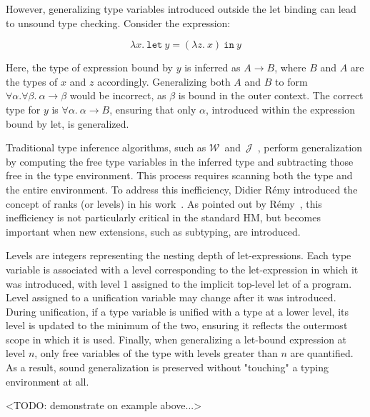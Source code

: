 However, generalizing type variables introduced outside the let binding can lead to unsound type checking. Consider the expression:

$$
\lambda x.\ \texttt{let}\ y = (\lambda z.\ x)\ \texttt{in}\ y
$$

Here, the type of expression bound by $y$ is inferred as $A \to B$, where $B$ and $A$ are the types of $x$ and $z$ accordingly. Generalizing both $A$ and $B$ to form $\forall \alpha. \forall \beta.\ \alpha \to \beta$ would be incorrect, as $\beta$ is bound in the outer context. The correct type for $y$ is $\forall \alpha.\ \alpha \to B$, ensuring that only $\alpha$, introduced within the expression bound by let, is generalized.

Traditional type inference algorithms, such as $\mathcal{W}$~and~$\mathcal{J}$~\cite{Milner1978_TypePolymorphism}, perform generalization by computing the free type variables in the inferred type and subtracting those free in the type environment. This process requires scanning both the type and the entire environment. To address this inefficiency, Didier R\'emy introduced the concept of ranks (or levels) in his work~\cite{Remy1992_SortedEqTheoryTypes}. As pointed out by R\'emy~\cite{Remy1992_SortedEqTheoryTypes}, this inefficiency is not particularly critical in the standard HM, but becomes important when new extensions, such as subtyping, are introduced.

Levels are integers representing the nesting depth of let-expressions. Each type variable is associated with a level corresponding to the let-expression in which it was introduced, with level 1 assigned to the implicit top-level let of a program. Level assigned to a unification variable may change after it was introduced. During unification, if a type variable is unified with a type at a lower level, its level is updated to the minimum of the two, ensuring it reflects the outermost scope in which it is used. Finally, when generalizing a let-bound expression at level $n$, only free variables of the type with levels greater than $n$ are quantified. As a result, sound generalization is preserved without "touching" a typing environment at all.

<TODO: demonstrate on example above...>


